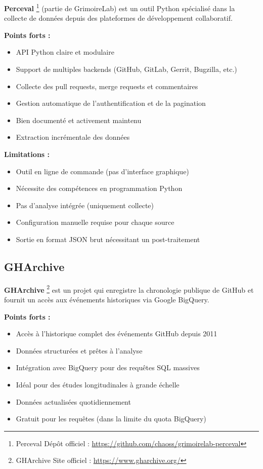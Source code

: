 \textbf{Perceval} \footnote{Perceval Dépôt officiel : \url{https://github.com/chaoss/grimoirelab-perceval}} (partie de GrimoireLab) est un outil Python spécialisé dans la collecte de données depuis des plateformes de développement collaboratif.

\textbf{Points forts :}
\begin{itemize}
    \item API Python claire et modulaire
    \item Support de multiples backends (GitHub, GitLab, Gerrit, Bugzilla, etc.)
    \item Collecte des pull requests, merge requests et commentaires
    \item Gestion automatique de l'authentification et de la pagination
    \item Bien documenté et activement maintenu
    \item Extraction incrémentale des données
\end{itemize}

\textbf{Limitations :}
\begin{itemize}
    \item Outil en ligne de commande (pas d'interface graphique)
    \item Nécessite des compétences en programmation Python
    \item Pas d'analyse intégrée (uniquement collecte)
    \item Configuration manuelle requise pour chaque source
    \item Sortie en format JSON brut nécessitant un post-traitement
\end{itemize}

\subsection{GHArchive}

\textbf{GHArchive} \footnote{GHArchive Site officiel : \url{https://www.gharchive.org/}} est un projet qui enregistre la chronologie publique de GitHub et fournit un accès aux événements historiques via Google BigQuery.

\textbf{Points forts :}
\begin{itemize}
    \item Accès à l'historique complet des événements GitHub depuis 2011
    \item Données structurées et prêtes à l'analyse
    \item Intégration avec BigQuery pour des requêtes SQL massives
    \item Idéal pour des études longitudinales à grande échelle
    \item Données actualisées quotidiennement
    \item Gratuit pour les requêtes (dans la limite du quota BigQuery)
\end{itemize}

